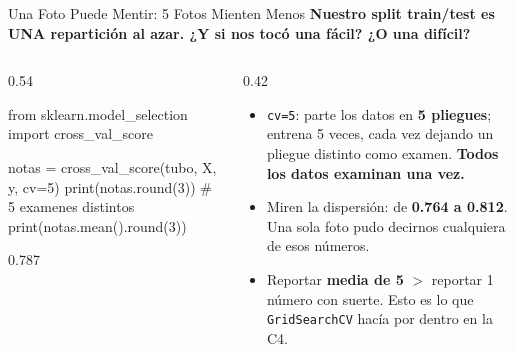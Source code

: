 \documentclass[aspectratio=169, 11pt]{beamer}
\begin{document}
\begin{frame}[fragile,shrink=20]{Una Foto Puede Mentir: 5 Fotos Mienten Menos}
  \vspace{-4pt}
  {\small\color{arcaDark}\bfseries
    Nuestro split train/test es UNA repartición al azar. ¿Y si nos tocó una fácil? ¿O una difícil?}

  \vspace{4pt}
  \begin{columns}[T]
    \begin{column}{0.54\textwidth}
      \begin{pyblock}
from sklearn.model_selection import cross_val_score

notas = cross_val_score(tubo, X, y, cv=5)
print(notas.round(3))   # 5 examenes distintos
print(notas.mean().round(3))
      \end{pyblock}
      \vspace{2pt}
      \begin{outputblock}[]
[0.789 0.781 0.812 0.787 0.764]
0.787
      \end{outputblock}
    \end{column}
    \begin{column}{0.42\textwidth}
      {\scriptsize\color{textMuted}
      \begin{itemize}\setlength{\itemsep}{5pt}
        \item[{\color{arcaRed}\scriptsize\faRedo}]
          \texttt{cv=5}: parte los datos en \textbf{5 pliegues};
          entrena 5 veces, cada vez dejando un pliegue distinto
          como examen. \textbf{Todos los datos examinan una vez.}
        \item[{\color{arcaRed}\scriptsize\faEye}]
          Miren la dispersión: de \textbf{0.764 a 0.812}.
          Una sola foto pudo decirnos cualquiera de esos números.
        \item[{\color{codeGreen}\scriptsize\faCheck}]
          Reportar \textbf{media de 5} \(>\) reportar 1 número
          con suerte. Esto es lo que \texttt{GridSearchCV}
          hacía por dentro en la C4.
      \end{itemize}
      }
    \end{column}
  \end{columns}
\end{frame}
\end{document}
